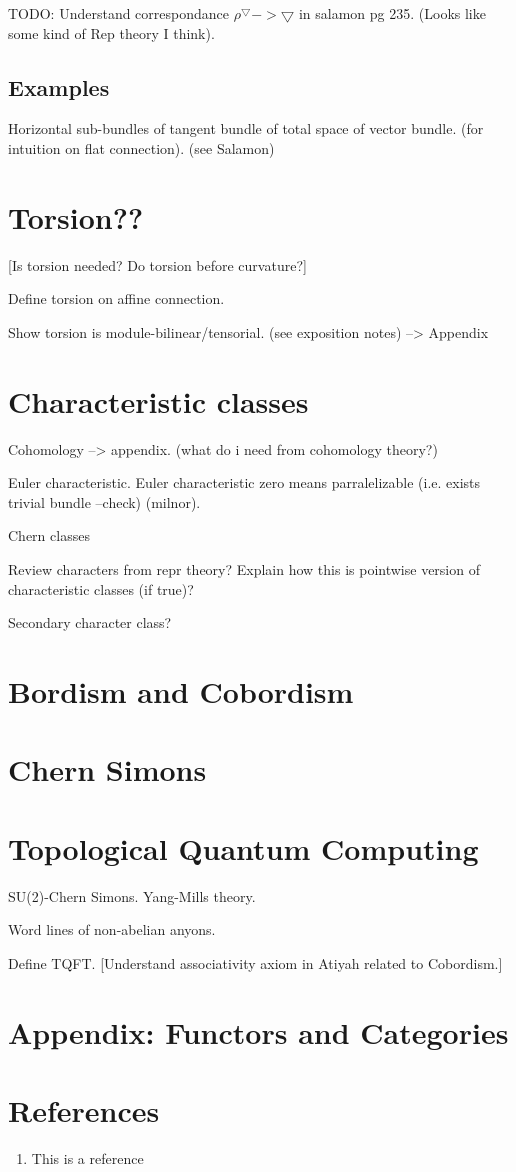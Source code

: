 \documentclass[a4paper]{article}
\theoremstyle{definition} \newtheorem*{definition}{Definition}
\theoremstyle{definition} \newtheorem*{definitions}{Definitions}
\theoremstyle{plain} \newtheorem{theorem}{Theorem}[section]
\theoremstyle{plain} \newtheorem{proposition}[theorem]{Proposition}
\theoremstyle{plain} \newtheorem{corollary}[theorem]{Corollary}
\theoremstyle{plain} \newtheorem{lemma}[theorem]{Lemma}
\theoremstyle{plain} \newtheorem{example}[theorem]{Example}
\begin{document}
TODO: Understand correspondance $\rho^\bigtriangledown -> \bigtriangledown$ in salamon pg 235. (Looks like some kind of Rep theory I think).

\subsection{Examples}

Horizontal sub-bundles of tangent bundle of total space of vector bundle. (for intuition on flat connection). (see Salamon)



\section{Torsion??}
[Is torsion needed? Do torsion before curvature?]

Define torsion on affine connection. 

Show torsion is module-bilinear/tensorial. (see exposition notes) --> Appendix

\section{Characteristic classes}
Cohomology --> appendix. (what do i need from cohomology theory?)

Euler characteristic. Euler characteristic zero means parralelizable (i.e. exists trivial bundle --check) (milnor).

Chern classes

Review characters from repr theory? Explain how this is pointwise version of characteristic classes (if true)?

Secondary character class?

\section{Bordism and Cobordism}

\section{Chern Simons}


\section{Topological Quantum Computing}
SU(2)-Chern Simons. Yang-Mills theory.

Word lines of non-abelian anyons.

Define TQFT. [Understand associativity axiom in Atiyah related to Cobordism.]

\section{Appendix: Functors and Categories}

\section*{References}
\begin{enumerate}
\item This is a reference
\end{enumerate}
\end{document}
